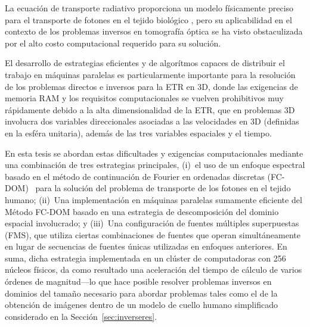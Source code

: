 La ecuación de transporte radiativo proporciona un
modelo físicamente preciso para el transporte de fotones en el tejido biológico
\cite{Klose2009, Arridge2009}, pero su aplicabilidad en el contexto de
los problemas inversos en tomografía óptica se ha visto obstaculizada por el alto costo computacional requerido para su solución. 

El desarrollo de estrategias eficientes y de algorítmos capaces de distribuir el trabajo en máquinas paralelas es particularmente importante para la
resolución de los problemas directos e inversos para la ETR en 3D, donde las exigencias 
de memoria RAM y
los requisitos computacionales se vuelven prohibitivos muy rápidamente
debido a la alta dimensionalidad de la ETR, que en problemas 3D
involucra dos variables direccionales asociadas a las velocidades en 3D (definidas 
en la esféra unitaria), además de las tres variables espaciales y el tiempo.

En esta tesis se abordan estas dificultades y exigencias computacionales 
mediante una combinación de tres estrategias principales, (i)~el uso de
un enfoque espectral basado en el método de continuación de Fourier 
en ordenadas discretas
(FC-DOM)~\cite{Gaggioli2019} para la solución del 
problema de transporte de los fotones en el tejido humano; (ii)~Una implementación 
en máquinas paralelas sumamente eficiente del
Método FC-DOM basado en una estrategia de descomposición del dominio espacial 
involucrado; y (iii)~Una configuración de fuentes múltiples superpuestas (FMS), que utiliza ciertas combinaciones de fuentes que operan simultáneamente en lugar de
secuencias de fuentes únicas utilizadas en enfoques anteriores. En suma, 
dicha estrategia 
implementada en un clúster de computadoras con 256 núcleos físicos, da como resultado una aceleración del tiempo de cálculo de varios órdenes de
magnitud---lo que hace posible resolver problemas inversos en dominios del 
tamaño necesario para abordar 
problemas tales como el de la obtención de imágenes dentro de un modelo de cuello
humano simplificado considerado en la Sección~\ref{sec:inverseres}.

